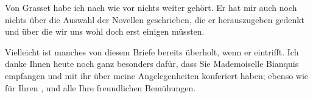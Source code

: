 \pstart
           Von Grasset habe ich nach wie vor nichts
               weiter gehört. Er hat mir auch noch nichts über die Auswahl der Novellen geschrieben,
               die er herauszugeben gedenkt und über die wir uns wohl doch erst einigen müssten.\pend
           
\pstart
           Vielleicht ist manches von diesem Briefe bereits überholt, wenn er eintrifft. Ich
               danke Ihnen heute noch ganz besonders dafür, dass Sie Mademoiselle Bianquis empfangen und mit ihr über meine Angelegenheiten
               konferiert haben; ebenso wie für Ihren \label{K_L03956-4v}\label{K_L03956-4}, und alle Ihre freundlichen Bemühungen.\pend
           
